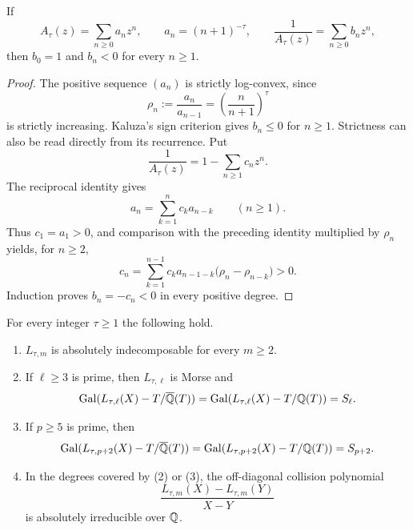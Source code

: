 \begin{lemma}
\label{lem:strict-kaluza}
If
\[
A_\tau(z)=\sum_{n\ge0}a_nz^n,
\qquad a_n=(n+1)^{-\tau},
\qquad
\frac1{A_\tau(z)}=\sum_{n\ge0}b_nz^n,
\]
then $b_0=1$ and $b_n<0$ for every $n\ge1$.
\end{lemma}

\begin{proof}
The positive sequence $(a_n)$ is strictly log-convex, since
\[
\rho_n:=\frac{a_n}{a_{n-1}}
=\left(\frac n{n+1}\right)^\tau
\]
is strictly increasing. Kaluza's sign criterion \cite{Kaluza1928} gives
$b_n\le0$ for $n\ge1$. Strictness can also be read directly from its
recurrence. Put
\[
\frac1{A_\tau(z)}=1-\sum_{n\ge1}c_nz^n.
\]
The reciprocal identity gives
\[
a_n=\sum_{k=1}^n c_ka_{n-k}\qquad(n\ge1).
\]
Thus $c_1=a_1>0$, and comparison with the preceding identity multiplied by
$\rho_n$ yields, for $n\ge2$,
\begin{equation}
c_n=\sum_{k=1}^{n-1}c_ka_{n-1-k}
\bigl(\rho_n-\rho_{n-k}\bigr)>0.
\label{eq:strict-kaluza-recurrence}
\end{equation}
Induction proves $b_n=-c_n<0$ in every positive degree.
\end{proof}

\begin{theorem}
\label{thm:polylog-global}
For every integer $\tau\ge1$ the following hold.
\begin{enumerate}
\item $L_{\tau,m}$ is absolutely indecomposable for every $m\ge2$.
\item If $\ell\ge3$ is prime, then $L_{\tau,\ell}$ is Morse and
\[
\operatorname{Gal}(L_{\tau,\ell}(X)-T/\overline{\mathbb Q}(T))
=\operatorname{Gal}(L_{\tau,\ell}(X)-T/\mathbb Q(T))=S_\ell.
\]
\item If $p\ge5$ is prime, then
\[
\operatorname{Gal}(L_{\tau,p+2}(X)-T/\overline{\mathbb Q}(T))
=\operatorname{Gal}(L_{\tau,p+2}(X)-T/\mathbb Q(T))=S_{p+2}.
\]
\item In the degrees covered by (2) or (3), the off-diagonal collision
polynomial
\[
\frac{L_{\tau,m}(X)-L_{\tau,m}(Y)}{X-Y}
\]
is absolutely irreducible over $\mathbb Q$.
\end{enumerate}
\end{theorem}

